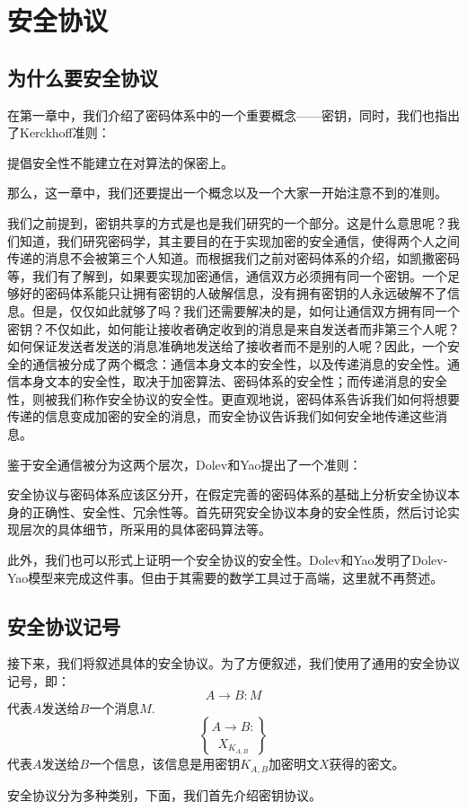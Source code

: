 \chapter{安全协议}
\section{为什么要安全协议}
在第一章中，我们介绍了密码体系中的一个重要概念——密钥，同时，我们也指出了Kerckhoff准则：\par
提倡安全性不能建立在对算法的保密上。\par
那么，这一章中，我们还要提出一个概念以及一个大家一开始注意不到的准则。\par
我们之前提到，密钥共享的方式是也是我们研究的一个部分。这是什么意思呢？我们知道，我们研究密码学，其主要目的在于实现加密的安全通信，使得两个人之间传递的消息不会被第三个人知道。而根据我们之前对密码体系的介绍，如凯撒密码等，我们有了解到，如果要实现加密通信，通信双方必须拥有同一个密钥。一个足够好的密码体系能只让拥有密钥的人破解信息，没有拥有密钥的人永远破解不了信息。但是，仅仅如此就够了吗？我们还需要解决的是，如何让通信双方拥有同一个密钥？不仅如此，如何能让接收者确定收到的消息是来自发送者而非第三个人呢？如何保证发送者发送的消息准确地发送给了接收者而不是别的人呢？因此，一个安全的通信被分成了两个概念：通信本身文本的安全性，以及传递消息的安全性。通信本身文本的安全性，取决于加密算法、密码体系的安全性；而传递消息的安全性，则被我们称作安全协议的安全性。更直观地说，密码体系告诉我们如何将想要传递的信息变成加密的安全的消息，而安全协议告诉我们如何安全地传递这些消息。\par
鉴于安全通信被分为这两个层次，Dolev和Yao提出了一个准则：\par
安全协议与密码体系应该区分开，在假定完善的密码体系的基础上分析安全协议本身的正确性、安全性、冗余性等。首先研究安全协议本身的安全性质，然后讨论实现层次的具体细节，所采用的具体密码算法等。\par
此外，我们也可以形式上证明一个安全协议的安全性。Dolev和Yao发明了Dolev-Yao模型来完成这件事。但由于其需要的数学工具过于高端，这里就不再赘述。
\section{安全协议记号}
接下来，我们将叙述具体的安全协议。为了方便叙述，我们使用了通用的安全协议记号，即：
\[A\to B: M\]
代表$A$发送给$B$一个消息$M$.
\[A\to B: \brace{X}_{K_{A, B}}\]
代表$A$发送给$B$一个信息，该信息是用密钥$K_{A, B}$加密明文$X$获得的密文。\par
安全协议分为多种类别，下面，我们首先介绍密钥协议。

